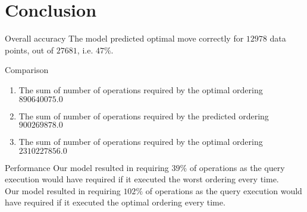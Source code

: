 \section{Conclusion}
\frame{\sectionpage}

\begin{frame}{Overall accuracy}
    The model predicted optimal move correctly for $12978$ data points, out of $27681$, i.e. $47\%$.\\
\end{frame}

\begin{frame}{Comparison}
    \begin{enumerate}
        \item The sum of number of operations required by the optimal ordering  $890640075.0$
        \item The sum of number of operations required by the predicted ordering $900269878.0$
        \item The sum of number of operations required by the optimal ordering $2310227856.0$
    \end{enumerate}
\end{frame}

\begin{frame}{Performance}
    Our model resulted in requiring $39\%$ of operations as the query execution would have required if it executed the worst ordering every time.\\
    Our model resulted in requiring $102\%$ of operations as the query execution would have required if it executed the optimal ordering every time.\\
\end{frame}


